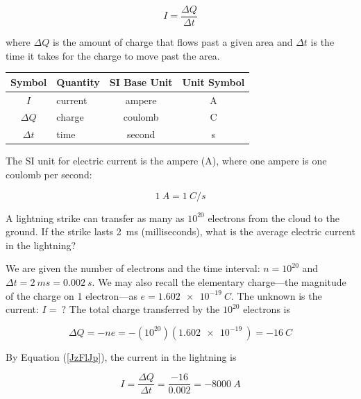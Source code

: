 \documentclass[main.tex]{subfiles}
\begin{document}
\begin{equation} \label{JzFlJp}
    I = \frac{\Delta Q}{\Delta t}
\end{equation}

where $\Delta{Q}$ is the amount of charge that flows past a given area and $\Delta{t}$ is the time it takes for the charge to move past the area.

\begin{center}
    \begin{tabular}{cl|cc}
    \hline
    \textbf{Symbol} & \textbf{Quantity} & \textbf{SI Base Unit} & \textbf{Unit Symbol}  \\
    \hline\hline
    \rule{0pt}{2.5ex}
        $I$ & current & ampere & A\\
        $\Delta{Q}$ & charge & coulomb & C\\
        $\Delta{t}$ & time & second & s\\
    \hline
    \end{tabular}
\end{center}

 The SI unit for electric current is the \gls{ampere} (A), where one ampere is one coulomb per second:

\begin{equation}
    \SI{1}{A} = \SI{1}{C/s}
\end{equation}

\clearpage

\begin{example}
    A lightning strike can transfer as many as $10^{20}$ electrons from the cloud to the ground. If the strike lasts \SI{2}{ms} (milliseconds), what is the average electric current in the lightning?
\end{example}

\Solution We are given the number of electrons and the time interval: $n = 10^{20}$ and $\Delta t = \SI{2}{ms} = \SI{0.002}{s}$. We may also recall the elementary charge---the magnitude of the charge on 1 electron---as $e = \SI{1.602e-19}{C}$. The unknown is the current: $I =\ ?$ The total charge transferred by the $10^{20}$ electrons is

\begin{equation*}
    \Delta Q = -ne = -(10^{20})(\SI{1.602e-19}{}) = \SI{-16}{C}
\end{equation*}

By Equation (\ref{JzFlJp}), the current in the lightning is

\begin{equation*}
    I = \frac{\Delta Q}{\Delta t} = \frac{-16}{0.002} = \SI{-8000}{A}
\end{equation*}
\end{document}
